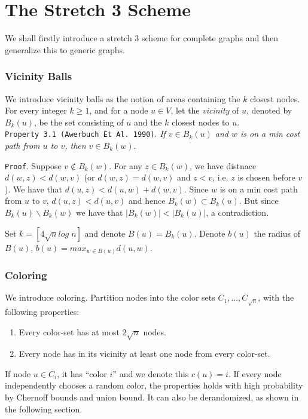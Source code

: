 \chapter{The Stretch 3 Scheme}
We shall firstly introduce a stretch 3 scheme for complete graphs and then generalize this to generic graphs.

\subsection{Vicinity Balls}
We introduce vicinity balls as the notion of areas containing the $k$ closest nodes. For every integer $k \geq 1$, and for a node $u \in V$, let the \textit{vicinity} of $u$, denoted by $B_k(u)$, be the set consisting of $u$ and the $k$ closest nodes to $u$.\\

\texttt{Property 3.1 (Awerbuch Et Al. 1990)}. \textit{If $v\in B_k(u)$ and $w$ is on a min cost path from $u$ to $v$, then $v\in B_k(w)$}.

\texttt{Proof}. Suppose $v\not\in B_k(w)$. For any $z\in B_k(w)$, we have distnace $d(w,z) < d(w,v)$ (or $d(w,z) = d(w,v)$ and $z < v$, i.e. $z$ is chosen before $v$). We have that $d(u,z) < d(u,w) + d(w,v)$. Since $w$ is on a min cost path from $u$ to $v$, $d(u,z) < d(u,v)$ and hence $B_k(w) \subset B_k(u)$. But since $B_k(u) \backslash B_k(w)$ we have that $|B_k(w)| < |B_k(u)|$, a contradiction.

Set $k=[4 \sqrt{n}log\; n]$ and denote $B(u) = B_k(u)$. Denote $b(u)$ the radius of $B(u)$, $b(u)=max_{w\in B(u)} d(u,w)$.

\subsection{Coloring}
We introduce coloring.
Partition nodes into the color sets $C_1,\dots,C_{\sqrt{n}}$, with the following properties:
\begin{enumerate}
    \item Every color-set has at most $2 \sqrt{n}$ nodes.
    \item Every node has in its vicinity at least one node from every color-set.
\end{enumerate}

If node $u\in C_i$, it has ``color $i$'' and we denote this $c(u)=i$. If every node independently chooses a random color, the properties holds with high probability by Chernoff bounds and union bound. It can also be derandomized, as shown in the following section.

